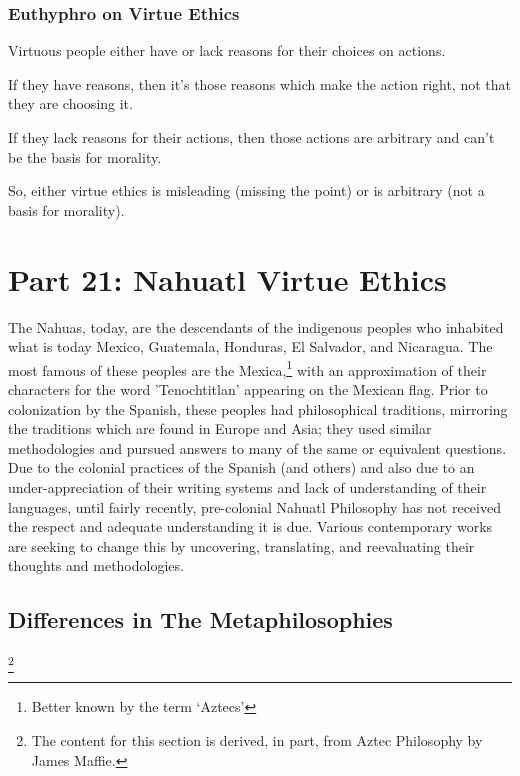\subsection{Euthyphro on Virtue Ethics}
\begin{earg}
    \item[1] Virtuous people either have or lack reasons for their choices on actions.
    \item[2] If they have reasons, then it’s those reasons which make the action right, not that they are choosing it.
    \item[3] If they lack reasons for their actions, then those actions are arbitrary and can’t be the basis for morality.
    \item[4] So, either virtue ethics is misleading (missing the point) or is arbitrary (not a basis for morality).
\end{earg}

\chapter{Part 21: Nahuatl Virtue Ethics}

The Nahuas, today, are the descendants of the indigenous peoples who inhabited what is today Mexico, Guatemala, Honduras, El Salvador, and Nicaragua. The most famous of these peoples are the Mexica,\footnote{Better known by the term `Aztecs'} with an approximation of their characters for the word 'Tenochtitlan' appearing on the Mexican flag. Prior to colonization by the Spanish, these peoples had philosophical traditions, mirroring the traditions which are found in Europe and Asia; they used similar methodologies and pursued answers to many of the same or equivalent questions. Due to the colonial practices of the Spanish (and others) and also due to an under-appreciation of their writing systems and lack of understanding of their languages, until fairly recently, pre-colonial Nahuatl Philosophy has not received the respect and adequate understanding it is due. Various contemporary works are seeking to change this by uncovering, translating, and reevaluating their thoughts and methodologies. 
\section{Differences in The Metaphilosophies}\footnote{The content for this section is derived, in part, from Aztec Philosophy by James Maffie.\autocite{Maffie1}}

